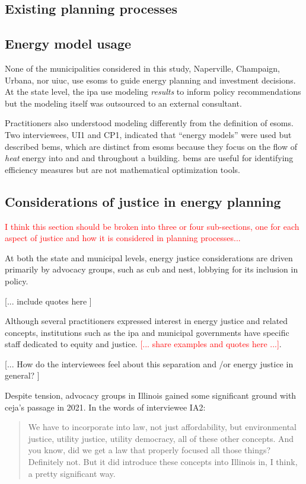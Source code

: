 \subsection{Existing planning processes}
\subsection{Energy model usage}

None of the municipalities considered in this study, Naperville, Champaign,
Urbana, nor \ac{uiuc}, use \acp{esom} to guide energy planning and investment
decisions. At the state level, the \ac{ipa} use modeling \textit{results} to inform
policy recommendations but the modeling itself was outsourced to an external consultant.

Practitioners also understood modeling differently from the definition of \acp{esom}.
Two interviewees, UI1 and CP1, indicated that ``energy models'' were used but described
\acp{bem}, which are distinct from \acp{esom} because they focus on the flow of \textit{heat}
energy into and and throughout a building. \acp{bem} are useful for identifying efficiency measures
but are not mathematical optimization tools.


\subsection{Considerations of justice in energy planning}
\textcolor{red}{I think this section should be broken into three or four sub-sections, one
for each aspect of justice and how it is considered in planning processes...}

At both the state and municipal levels, energy justice considerations are driven
primarily by advocacy groups, such as \ac{cub} and \ac{nest}, lobbying for its
inclusion in policy. 

[... include quotes here ]

Although several practitioners expressed interest in energy justice and related
concepts, institutions such as the \ac{ipa} and municipal governments have
specific staff dedicated to equity and justice. \textcolor{red}{[... share
examples and quotes here ...]}. 

[... How do the interviewees feel about this separation and /or energy justice
in general? ]

Despite tension, advocacy groups in Illinois gained some significant ground with
\ac{ceja}'s passage in 2021. In the words of interviewee IA2:

\begin{quote}
    We have to incorporate into law, not just affordability, but environmental
    justice, utility justice, utility democracy, all of these other concepts.
    And you know, did we get a law that properly focused all those things?
    Definitely not. But it did introduce these concepts into Illinois in, I
    think, a pretty significant way.
\end{quote}

